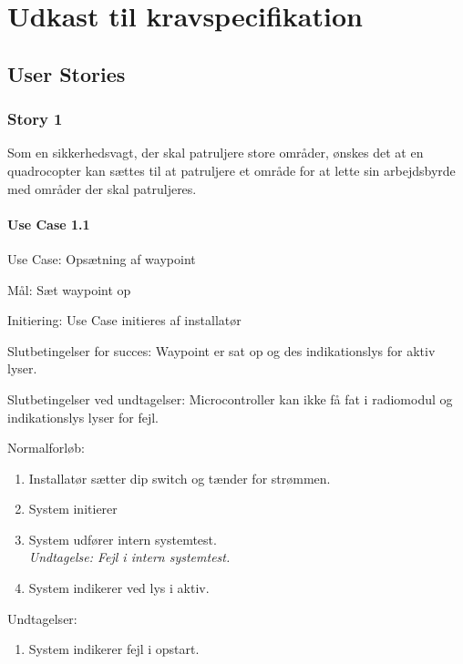 \documentclass[Main]{subfiles}
\begin{document}
\chapter{Udkast til kravspecifikation}


\section{User Stories}

\subsection{Story 1}
Som en sikkerhedsvagt, der skal patruljere store områder, ønskes det at en quadrocopter kan sættes til at patruljere et område for at lette sin arbejdsbyrde med områder der skal patruljeres.


\subsubsection{Use Case 1.1}


Use Case: Opsætning af waypoint

Mål: Sæt waypoint op

Initiering: Use Case initieres af installatør

Slutbetingelser for succes: Waypoint er sat op og des indikationslys for aktiv lyser.

Slutbetingelser ved undtagelser: 
Microcontroller kan ikke få fat i radiomodul og indikationslys lyser for fejl.


Normalforløb: 
	
	\begin{enumerate}
	\item Installatør sætter dip switch og tænder for strømmen.
	\item System initierer
	\item System udfører intern systemtest.
	\\ \textit{Undtagelse: Fejl i intern systemtest.}
	\item System indikerer ved lys i aktiv.
	\end{enumerate}



Undtagelser:

	\begin{enumerate}
	\item System indikerer fejl i opstart.
	\end{enumerate}
\end{document}
